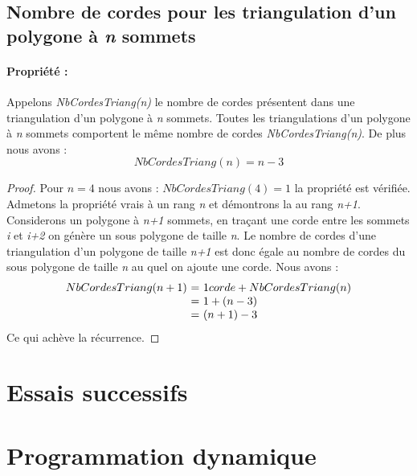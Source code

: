 \documentclass[a4paper,10pt]{article}
\begin{document}
\subsection{Nombre de cordes pour les triangulation d'un polygone à \emph{n} sommets}

\paragraph{Propriété :}  
Appelons \emph{NbCordesTriang(n)} le nombre de cordes présentent dans une triangulation d'un polygone à \emph{n} sommets.
Toutes les triangulations d'un polygone à \emph{n} sommets comportent le même nombre de cordes \emph{NbCordesTriang(n)}.
De plus nous avons :
\begin{equation} 
NbCordesTriang(n) = n-3
\end{equation}

\begin{proof}
Pour \(n = 4\) nous avons : \(NbCordesTriang(4) = 1 \) la propriété est vérifiée. \\
Admetons la propriété vrais à un rang \emph{n} et démontrons la au rang \emph{n+1}. \\
Considerons un polygone à \emph{n+1} sommets, en traçant une corde entre les sommets \emph{i} et \emph{i+2} on génère un sous polygone de taille \emph{n}.
Le nombre de cordes d'une triangulation d'un polygone de taille \emph{n+1} est donc égale au nombre de cordes du sous polygone de taille \emph{n} au quel on ajoute une corde.
Nous avons :\\
\[
\begin{array}{r @{=} l}
NbCordesTriang(n+1) \ & \  1 corde + NbCordesTriang(n) \\
			  & \ 1 + (n-3) \\
			  & \ (n+1) - 3
\end{array}
\]
Ce qui achève la récurrence.
\end{proof}





\section{Essais successifs}

\section{Programmation dynamique}
\end{document}
